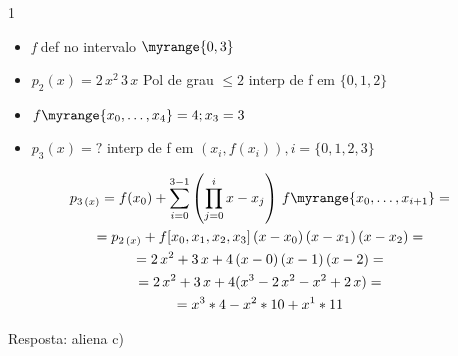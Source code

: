 \documentclass["CN_A-Tests_Resolutions.tex"]{subfiles}
\begin{document}
\begin{questionBox}1{} %

  \begin{itemize}
    \item \textit{f} def no intervalo \(\myrange{0,3}\)
    \item \(p_2(x)=2\,x^2\,3\,x\) Pol de grau \(\leq 2\) interp de f em \(\{0,1,2\}\)
    \item \(f\myrange{x_0,\dots,x_4}=4; x_3 = 3\)
  \item \(p_3(x)=?\) interp de f em \((x_i,f(x_i)),i=\{0,1,2,3\}\)
  \end{itemize}

  \answer{}

  \begin{gather*}
    p_{3\,(x)}
    = f(x_0)
    + \sum_{i=0}^{3-1}{
      \left(\prod_{j=0}^{i}{x-x_j}\right)
      \,f\myrange{x_0,\dots,x_{i+1}}
    }
    = \\
    = p_{2\,(x)}
    + f[x_0,x_1,x_2,x_3]
    \,( x-x_0)
    \,( x-x_1)
    \,( x-x_2)
    = \\
    = 2\,x^2+3\,x
    + 4
    \,( x-0)
    \,( x-1)
    \,( x-2)
    = \\
    = 2\,x^2+3\,x
    +4(
      x^3-2\,x^2
      -x^2+2\,x
    )
    = \\
    =x^3*4
    -x^2*10
    +x^1*11
  \end{gather*}

  Resposta: aliena c)


\end{questionBox}
\end{document}
